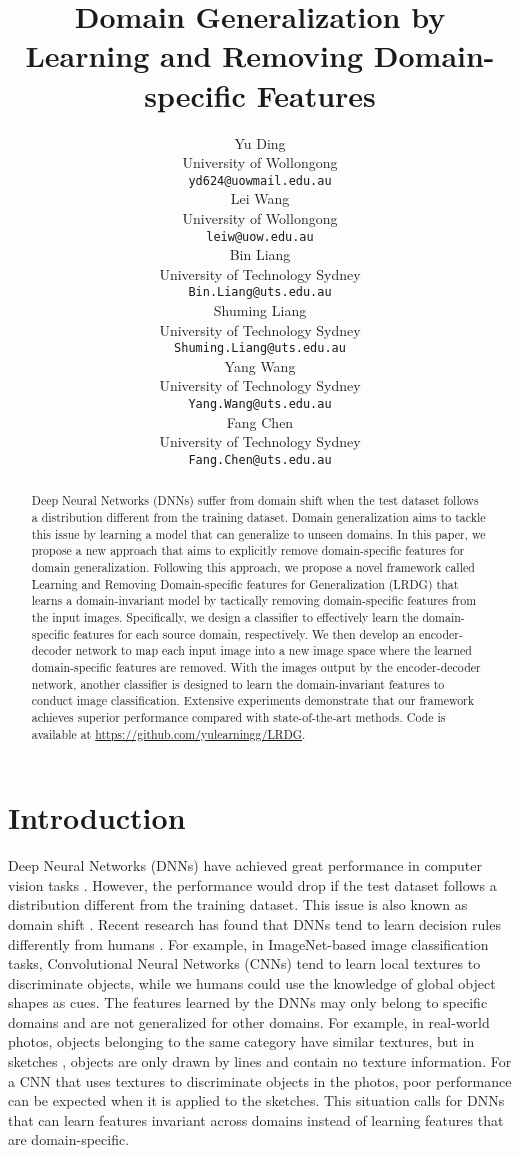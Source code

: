 \documentclass{article}
\title{Domain Generalization by Learning and Removing Domain-specific Features}
\author{Yu Ding \\
  University of Wollongong\\
  \texttt{yd624@uowmail.edu.au} \\
  \And
  Lei Wang \\
  University of Wollongong\\
  \texttt{leiw@uow.edu.au} \\
  \And
  Bin Liang \\
  University of Technology Sydney\\
  \texttt{Bin.Liang@uts.edu.au} \\
  \And
  Shuming Liang \\
  University of Technology Sydney\\
  \texttt{Shuming.Liang@uts.edu.au} \\
  \And
  Yang Wang \\
  University of Technology Sydney\\
  \texttt{Yang.Wang@uts.edu.au} \\
  \And
  Fang Chen \\
  University of Technology Sydney\\
  \texttt{Fang.Chen@uts.edu.au} \\
}
\begin{document}
\maketitle


\begin{abstract}
  Deep Neural Networks (DNNs) suffer from domain shift when the test dataset follows a distribution different from the training dataset. Domain generalization aims to tackle this issue by learning a model that can generalize to unseen domains. In this paper, we propose a new approach that aims to explicitly remove domain-specific features for domain generalization. Following this approach, we propose a novel framework called Learning and Removing Domain-specific features for Generalization (LRDG) that learns a domain-invariant model by tactically removing domain-specific features from the input images. Specifically, we design a classifier to effectively learn the domain-specific features for each source domain, respectively. We then develop an encoder-decoder network to map each input image into a new image space where the learned domain-specific features are removed. With the images output by the encoder-decoder network, another classifier is designed to learn the domain-invariant features to conduct image classification. Extensive experiments demonstrate that our framework achieves superior performance compared with state-of-the-art methods. Code is available at \url{https://github.com/yulearningg/LRDG}.
\end{abstract}


\section{Introduction}

Deep Neural Networks (DNNs) have achieved great performance in computer vision tasks \cite{krizhevsky2017imagenet}. However, the performance would drop if the test dataset follows a distribution different from the training dataset. This issue is also known as domain shift \cite{torralba2011unbiased}. Recent research has found that DNNs tend to learn decision rules differently from humans \cite{geirhos2018imagenet,hermann2020origins,geirhos2020shortcut}. For example, in ImageNet-based \cite{russakovsky2015imagenet} image classification tasks, Convolutional Neural Networks (CNNs) tend to learn local textures to discriminate objects, while we humans could use the knowledge of global object shapes as cues. The features learned by the DNNs may only belong to specific domains and are not generalized for other domains. For example, in real-world photos, objects belonging to the same category have similar textures, but in sketches \cite{li2017deeper}, objects are only drawn by lines and contain no texture information. For a CNN that uses textures to discriminate objects in the photos, poor performance can be expected when it is applied to the sketches. This situation calls for DNNs that can learn features invariant across domains instead of learning features that are domain-specific.
\end{document}
